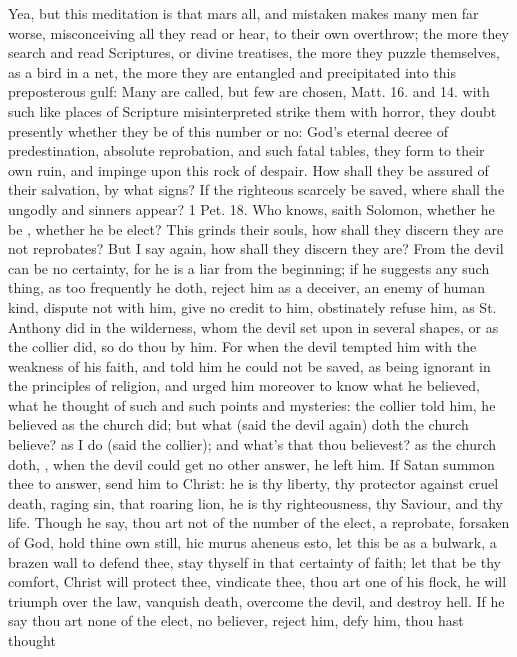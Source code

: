 {Yea, but this meditation is that mars all, and mistaken makes many men
far worse, misconceiving all they read or hear, to their own overthrow;
the more they search and read Scriptures, or divine treatises, the more
they puzzle themselves, as a bird in a net, the more they are entangled
and precipitated into this preposterous gulf: Many are called, but few
are chosen, Matt.  16. and  14. with such like places of
Scripture misinterpreted strike them with horror, they doubt presently
whether they be of this number or no: God's eternal decree of
predestination, absolute reprobation, and such fatal tables, they form
to their own ruin, and impinge upon this rock of despair. How shall
they be assured of their salvation, by what signs? If the righteous
scarcely be saved, where shall the ungodly and sinners appear? 1 Pet.
 18. Who knows, saith Solomon, whether he be , whether he be elect? This grinds
their souls, how shall they discern they are not reprobates? But I say
again, how shall they discern they are? From the devil can be no
certainty, for he is a liar from the beginning; if he suggests any such
thing, as too frequently he doth, reject him as a deceiver, an enemy of
human kind, dispute not with him, give no credit to him, obstinately
refuse him, as St. Anthony did in the wilderness, whom the devil set
upon in several shapes, or as the collier did, so do thou by him. For
when the devil tempted him with the weakness of his faith, and told him
he could not be saved, as being ignorant in the principles of religion,
and urged him moreover to know what he believed, what he thought of
such and such points and mysteries: the collier told him, he believed
as the church did; but what (said the devil again) doth the church
believe? as I do (said the collier); and what's that thou believest? as
the church doth, \etc{}, when the devil could get no other answer, he left
him. If Satan summon thee to answer, send him to Christ: he is thy
liberty, thy protector against cruel death, raging sin, that roaring
lion, he is thy righteousness, thy Saviour, and thy life. Though he
say, thou art not of the number of the elect, a reprobate, forsaken of
God, hold thine own still, hic murus aheneus esto, let this be as a
bulwark, a brazen wall to defend thee, stay thyself in that certainty
of faith; let that be thy comfort, Christ will protect thee, vindicate
thee, thou art one of his flock, he will triumph over the law, vanquish
death, overcome the devil, and destroy hell. If he say thou art none of
the elect, no believer, reject him, defy him, thou hast thought
}
